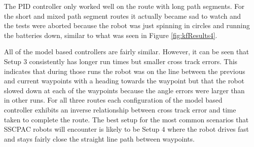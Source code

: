 The PID controller only worked well on the route with long path segments. For the short and mixed path segment routes it actually became sad to watch and the tests were aborted because the robot was just spinning in circles and running the batteries down, similar to what was seen in Figure \ref{fig:kfResults4}.

All of the model based controllers are fairly similar. However, it can be seen that Setup $3$ consistently has longer run times but smaller cross track errors. This indicates that during those runs the robot was on the line between the previous and current waypoints with a heading towards the waypoint but that the robot slowed down at each of the waypoints because the angle errors were larger than in other runs. For all three routes each configuration of the model based controller exhibits an inverse relationship between cross track error and time taken to complete the route. The best setup for the most common scenarios that SSCPAC robots will encounter is likely to be Setup $4$ where the robot drives fast and stays fairly close the straight line path between waypoints.
